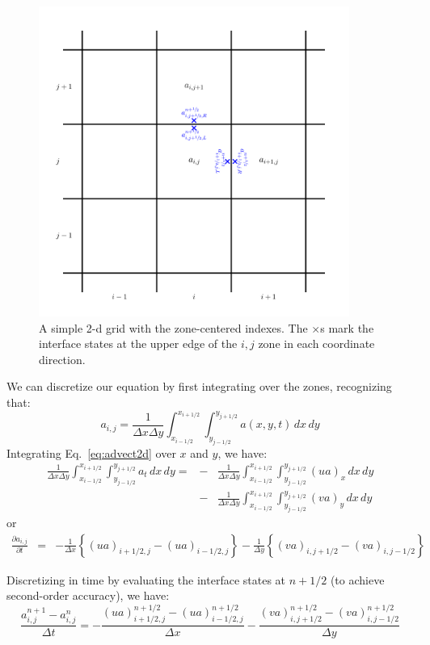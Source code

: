 \documentclass[11pt]{article}
\begin{document}
\begin{figure}[h]
\centering
\includegraphics[width=4.0in]{2dgrid}
\caption{\label{fig:2dgrid} A simple 2-d grid with the zone-centered
  indexes.  The $\times$s mark the interface states at the upper edge
  of the $i,j$ zone in each coordinate direction.}
\end{figure}

We can discretize our equation by first integrating over the zones, 
recognizing that:
\begin{equation}
a_{i,j} = \frac{1}{\Delta x \Delta y} 
   \int_{x_{i-1/2}}^{x_{i+1/2}} \int_{y_{j-1/2}}^{y_{j+1/2}} 
   a(x,y,t) \, dx \, dy
\end{equation}
Integrating Eq.~\ref{eq:advect2d} over $x$ and $y$, we have:
\begin{eqnarray}
\frac{1}{\Delta x \Delta y} 
  \int_{x_{i-1/2}}^{x_{i+1/2}} 
  \int_{y_{j-1/2}}^{y_{j+1/2}} a_t \, dx \, dy =  
  &-& \frac{1}{\Delta x \Delta y}
       \int_{x_{i-1/2}}^{x_{i+1/2}} \int_{y_{j-1/2}}^{y_{j+1/2}}
      (u a)_x \, dx \, dy \nonumber \\
  &-& \frac{1}{\Delta x \Delta y}
       \int_{x_{i-1/2}}^{x_{i+1/2}} \int_{y_{j-1/2}}^{y_{j+1/2}}
      (v a)_y \, dx \, dy 
\end{eqnarray}
or
\begin{eqnarray}
 \frac{\partial a_{i,j}}{\partial t} &=&
  - \frac{1}{\Delta x} \left \{ (u a)_{i+1/2,j} - (u a)_{i-1/2,j} \right \}
  - \frac{1}{\Delta y} \left \{ (v a)_{i,j+1/2} - (v a)_{i,j-1/2} \right \}
\end{eqnarray}

Discretizing in time by evaluating the interface states at $n+1/2$ 
(to achieve second-order accuracy), we have:
\begin{equation}
 \frac{a_{i,j}^{n+1} - a_{i,j}^n}{\Delta t} =
  - \frac{ (u a)_{i+1/2,j}^{n+1/2} - (u a)_{i-1/2,j}^{n+1/2} }{\Delta x}
  - \frac{ (v a)_{i,j+1/2}^{n+1/2} - (v a)_{i,j-1/2}^{n+1/2} }{\Delta y}
\label{eq:update2du}
\end{equation}
\end{document}
